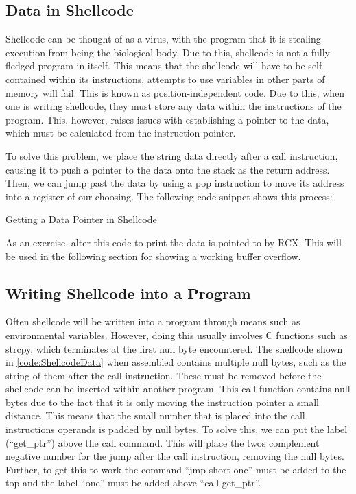 		\subsection{Data in Shellcode}
			Shellcode can be thought of as a virus, with the program that it is stealing execution from being the biological body.
			Due to this, shellcode is not a fully fledged program in itself.
			This means that the shellcode will have to be self contained within its instructions, attempts to use variables in other parts of memory will fail.
			This is known as position-independent code.
			Due to this, when one is writing shellcode, they must store any data within the instructions of the program.
			This, however, raises issues with establishing a pointer to the data, which must be calculated from the instruction pointer.

			To solve this problem, we place the string data directly after a call instruction, causing it to push a pointer to the data onto the stack as the return address.
			Then, we can jump past the data by using a pop instruction to move its address into a register of our choosing.
			The following code snippet shows this process:
			\begin{code}
				\caption{Getting a Data Pointer in Shellcode}\label{code:ShellcodeData}
			\end{code}

			As an exercise, alter this code to print the data is pointed to by RCX.
			This will be used in the following section for showing a working buffer overflow.

		\subsection{Writing Shellcode into a Program}
			Often shellcode will be written into a program through means such as environmental variables.
			However, doing this usually involves C functions such as strcpy, which terminates at the first null byte encountered.
			The shellcode shown in \ref{code:ShellcodeData} when assembled contains multiple null bytes, such as the string of them after the call instruction.
			These must be removed before the shellcode can be inserted within another program.
			This call function contains null bytes due to the fact that it is only moving the instruction pointer a small distance.
			This means that the small number that is placed into the call instructions operands is padded by null bytes.
			To solve this, we can put the label (``get\_ptr'') above the call command.
			This will place the twos complement negative number for the jump after the call instruction, removing the null bytes.
			Further, to get this to work the command ``jmp short one'' must be added to the top and the label ``one'' must be added above ``call get\_ptr''.

